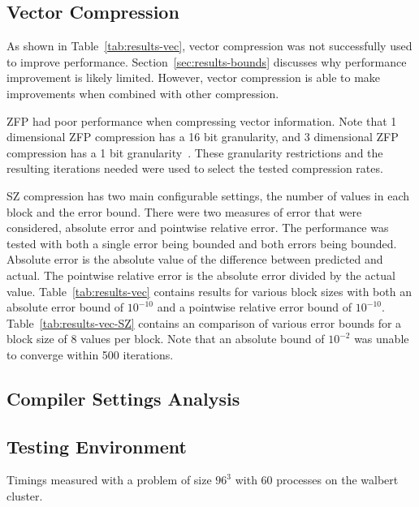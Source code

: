 \subsection{Vector Compression}
As shown in Table~\ref{tab:results-vec}, vector compression was not successfully used to improve performance.
Section~\ref{sec:results-bounds} discusses why performance improvement is likely limited.
However, vector compression is able to make improvements when combined with other compression.

ZFP had poor performance when compressing vector information.
Note that 1 dimensional ZFP compression has a 16 bit granularity, and 3 dimensional ZFP compression has a 1 bit granularity~\cite{Lindstrom:2014:zfp}.
These granularity restrictions and the resulting iterations needed were used to select the tested compression rates.

SZ compression has two main configurable settings, the number of values in each block and the error bound.
There were two measures of error that were considered, absolute error and pointwise relative error.
The performance was tested with both a single error being bounded and both errors being bounded.
Absolute error is the absolute value of the difference between predicted and actual.
The pointwise relative error is the absolute error divided by the actual value.
Table~\ref{tab:results-vec} contains results for various block sizes with both an absolute error bound of \(10^{-10}\) and a pointwise relative error bound of \(10^{-10}\).
Table~\ref{tab:results-vec-SZ} contains an comparison of various error bounds for a block size of 8 values per block.
Note that an absolute bound of \(10^{-2}\) was unable to converge within 500 iterations.



\subsection{Compiler Settings Analysis}

\subsection{Testing Environment}
Timings measured with a problem of size \(96^3\) with 60 processes on the walbert cluster.